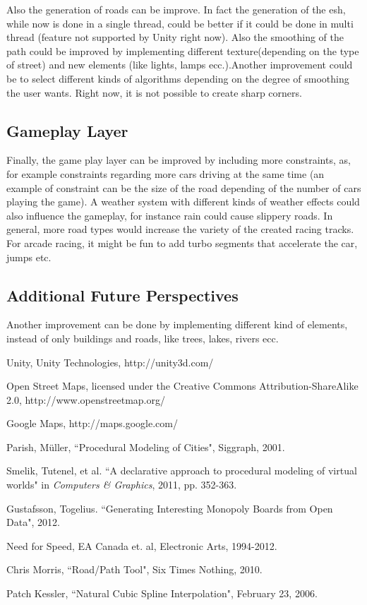 \documentclass[conference]{IEEEtran}
\begin{document}
Also the generation of roads can be improve. In fact the generation of the esh, while now is done in a single thread, could be better if it could be done in multi thread (feature not supported by Unity right now). Also the smoothing of the path could be improved by implementing different texture(depending on the type of street) and new elements (like lights, lamps ecc.).Another improvement could be to select different kinds of algorithms depending on the degree of smoothing the user wants. Right now, it is not possible to create sharp corners.

\subsection{Gameplay Layer}

Finally, the game play layer can be improved by including more constraints, as, for example constraints regarding more cars driving at the same time (an example of constraint can be the size of the road depending of the number of cars playing the game). A weather system with different kinds of weather effects could also influence the gameplay, for instance rain could cause slippery roads. In general, more road types would increase the variety of the created racing tracks. For arcade racing, it might be fun to add turbo segments that accelerate the car, jumps etc.

\subsection{Additional Future Perspectives}
Another improvement can be done by implementing different kind of elements, instead of only buildings and roads, like trees, lakes, rivers ecc.

\begin{thebibliography}{6}
 Unity, Unity Technologies, http://unity3d.com/

 Open Street Maps, licensed under the Creative Commons Attribution-ShareAlike 2.0, http://www.openstreetmap.org/

 Google Maps, http://maps.google.com/

 Parish, Müller, ``Procedural Modeling of Cities", Siggraph, 2001.

Smelik, Tutenel, et al. ``A declarative approach to procedural modeling of virtual worlds" in \emph{Computers \& Graphics}, 2011, pp. 352-363.

 Gustafsson, Togelius. ``Generating Interesting Monopoly Boards from Open Data", 2012.

 Need for Speed, EA Canada et. al, Electronic Arts, 1994-2012.

 Chris Morris, ``Road/Path Tool",  Six Times Nothing, 2010.

 Patch Kessler, ``Natural Cubic Spline Interpolation", February 23, 2006.


\end{thebibliography}

\end{document}
